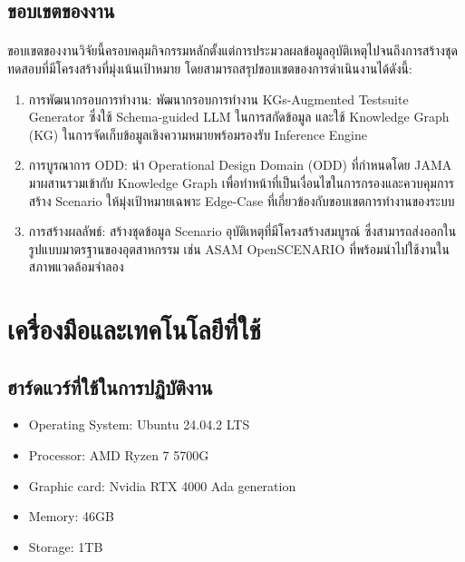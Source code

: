 \subsection{ขอบเขตของงาน}\label{subsec:work-scope}

\paragraph{}ขอบเขตของงานวิจัยนี้ครอบคลุมกิจกรรมหลักตั้งแต่การประมวลผลข้อมูลอุบัติเหตุไปจนถึงการสร้างชุดทดสอบที่มีโครงสร้างที่มุ่งเน้นเป้าหมาย โดยสามารถสรุปขอบเขตของการดำเนินงานได้ดังนี้:

\begin{enumerate}
    \item การพัฒนากรอบการทำงาน: พัฒนากรอบการทำงาน KGs-Augmented Testsuite Generator ซึ่งใช้ Schema-guided LLM ในการสกัดข้อมูล และใช้ Knowledge Graph (KG) ในการจัดเก็บข้อมูลเชิงความหมายพร้อมรองรับ Inference Engine
    \item การบูรณาการ ODD: นำ Operational Design Domain (ODD) ที่กำหนดโดย JAMA มาผสานรวมเข้ากับ Knowledge Graph เพื่อทำหน้าที่เป็นเงื่อนไขในการกรองและควบคุมการสร้าง Scenario ให้มุ่งเป้าหมายเฉพาะ Edge-Case ที่เกี่ยวข้องกับขอบเขตการทำงานของระบบ
    \item การสร้างผลลัพธ์: สร้างชุดข้อมูล Scenario อุบัติเหตุที่มีโครงสร้างสมบูรณ์ ซึ่งสามารถส่งออกในรูปแบบมาตรฐานของอุตสาหกรรม เช่น ASAM OpenSCENARIO ที่พร้อมนำไปใช้งานในสภาพแวดล้อมจำลอง
\end{enumerate}

\section{เครื่องมือและเทคโนโลยีที่ใช้}\label{sec:tools-and-tech}
\subsection{ฮาร์ดแวร์ที่ใช้ในการปฏิบัติงาน}\label{subsec:hardware-used}
\begin{itemize}
\item Operating System: Ubuntu 24.04.2 LTS
\item Processor: AMD Ryzen 7 5700G
\item Graphic card: Nvidia RTX 4000 Ada generation
\item Memory: 46GB
\item Storage: 1TB
\end{itemize}

